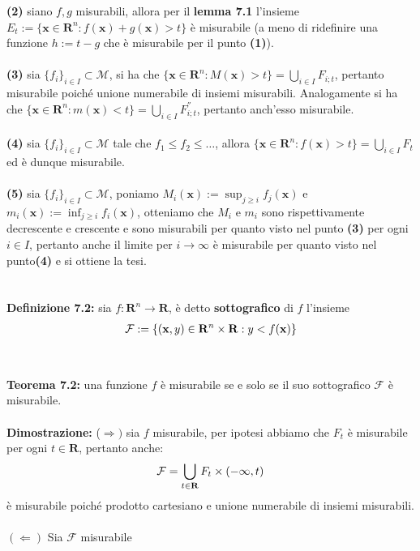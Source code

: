 \documentclass{article}
\begin{document}
\textbf{(2)} siano $f, g$ misurabili, allora per il \textbf{lemma 7.1} l'insieme \\ $E_t := \{ \mathbf{x} \in \mathbf{R}^n : f(\mathbf{x}) + g(\mathbf{x}) > t \}$ è misurabile (a meno di ridefinire una funzione $h := t - g$ che è misurabile per il punto \textbf{(1)}). \\ \\
\textbf{(3)} sia $\{ f_i \}_{i \in I} \subset \mathcal{M}$, si ha che $\{ \mathbf{x} \in \mathbf{R}^n : M(\mathbf{x}) > t \} = \bigcup_{i \in I} F_{i;t}$, pertanto misurabile poiché unione numerabile di insiemi misurabili. Analogamente si ha che $\{ \mathbf{x} \in \mathbf{R}^n : m(\mathbf{x}) < t \} = \bigcup_{i \in I} F_{i;t}^{''}$, pertanto anch'esso misurabile. \\ \\
\textbf{(4)} sia $\{ f_i \}_{i \in I} \subset \mathcal{M}$ tale che $f_1 \leq f_2 \leq \dots$, allora $\{ \mathbf{x} \in \mathbf{R}^n : f(\mathbf{x}) > t \} = \bigcup_{i \in I} F_t$ ed è dunque misurabile. \\ \\
\textbf{(5)} sia $\{ f_i \}_{i \in I} \subset \mathcal{M}$, poniamo $M_i(\mathbf{x}) := \sup_{j \geq i} f_j(\mathbf{x})$ e $m_i(\mathbf{x}) := \inf_{j \geq i} f_i(\mathbf{x})$, otteniamo che $M_i$ e $m_i$ sono rispettivamente decrescente e crescente e sono misurabili per quanto visto nel punto \textbf{(3)} per ogni $i \in I$, pertanto anche il limite per $i \rightarrow \infty$ è misurabile per quanto visto nel punto\textbf{(4)} e si ottiene la tesi. \\ \\ \\
\textbf{Definizione 7.2:} sia $f : \mathbf{R}^n \longrightarrow \mathbf{R}$, è detto \textbf{sottografico} di $f$ l'insieme
\begin{gather}
    \mathcal{F} := \{ (\mathbf{x}, y) \in \mathbf{R}^n \times \mathbf{R} : y < f(\mathbf{x}) \} \notag
\end{gather} \\ \\
\textbf{Teorema 7.2:} una funzione $f$ è misurabile se e solo se il suo sottografico $\mathcal{F}$ è misurabile. \\ \\
\textbf{Dimostrazione:} ($\Rightarrow)$ sia $f$ misurabile, per ipotesi abbiamo che $F_t$ è misurabile per ogni $t \in \mathbf{R}$, pertanto anche:
\begin{gather}
    \mathcal{F} = \bigcup_{t \in \mathbf{R}} F_t \times (-\infty, t) \notag
\end{gather}
è misurabile poiché prodotto cartesiano e unione numerabile di insiemi misurabili. \\ \\
$(\Leftarrow)$ Sia $\mathcal{F}$ misurabile
\end{document}

